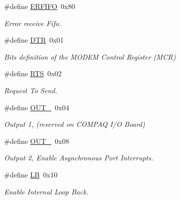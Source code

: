 \begin{DoxyCompactItemize}
\mbox{\label{group__i386__uart_gadacaa053442e8b1808e4bd33be7d12db}} 
\#define \mbox{\hyperlink{group__i386__uart_gadacaa053442e8b1808e4bd33be7d12db}{E\+R\+F\+I\+FO}}~0x80
\begin{DoxyCompactList}\small\item\em Error receive Fifo. \end{DoxyCompactList}\item 
\#define \mbox{\hyperlink{group__i386__uart_ga67198df5376db153ccd642a81d2623ad}{D\+TR}}~0x01
\begin{DoxyCompactList}\small\item\em Bits definition of the M\+O\+D\+EM Control Register (M\+CR) \end{DoxyCompactList}\item 
\mbox{\label{group__i386__uart_ga5da46cdb9a2133d1b4f0db71a332ba2e}} 
\#define \mbox{\hyperlink{group__i386__uart_ga5da46cdb9a2133d1b4f0db71a332ba2e}{R\+TS}}~0x02
\begin{DoxyCompactList}\small\item\em Request To Send. \end{DoxyCompactList}\item 
\mbox{\label{group__i386__uart_ga69935f16da7c62437bf70a37e61c3be4}} 
\#define \mbox{\hyperlink{group__i386__uart_ga69935f16da7c62437bf70a37e61c3be4}{O\+U\+T\+\_}}~0x04
\begin{DoxyCompactList}\small\item\em Output 1, (reserved on C\+O\+M\+P\+AQ I/O Board) \end{DoxyCompactList}\item 
\mbox{\label{group__i386__uart_gac5f4137d1a55c77759edf878353cbdd9}} 
\#define \mbox{\hyperlink{group__i386__uart_gac5f4137d1a55c77759edf878353cbdd9}{O\+U\+T\+\_}}~0x08
\begin{DoxyCompactList}\small\item\em Output 2, Enable Asynchronous Port Interrupts. \end{DoxyCompactList}\item 
\mbox{\label{group__i386__uart_gacc55daa58d88a3612f2ef74a6abbe97f}} 
\#define \mbox{\hyperlink{group__i386__uart_gacc55daa58d88a3612f2ef74a6abbe97f}{LB}}~0x10
\begin{DoxyCompactList}\small\item\em Enable Internal Loop Back. \end{DoxyCompactList}\item 

\end{DoxyCompactItemize}
